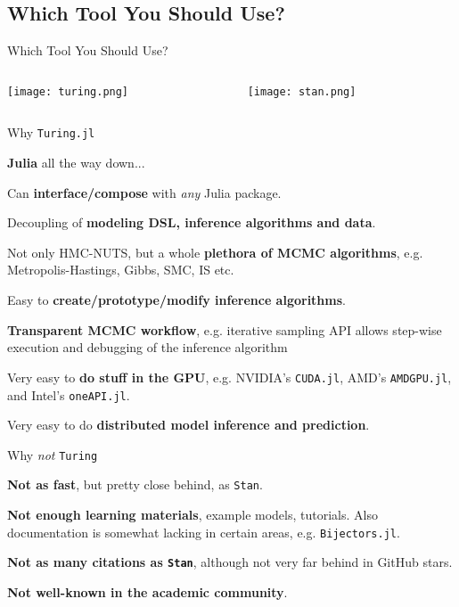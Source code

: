 \subsection{Which Tool You Should Use?}
\begin{frame}{Which Tool You Should Use?}
	\begin{columns}
		\begin{column}{0.5\textwidth}
			\centering
			\texttt{[image: turing.png]}
		\end{column}
		\begin{column}{0.5\textwidth}
			\centering
			\texttt{[image: stan.png]}
		\end{column}
	\end{columns}
\end{frame}

\begin{frame}{Why \texttt{Turing.jl}}
	\begin{vfilleditems}
		\item \textbf{Julia} all the way down...
		\item Can \textbf{interface/compose} with \textit{any} Julia package.
		\item Decoupling of \textbf{modeling DSL, inference algorithms and data}.
		\item Not only HMC-NUTS, but a whole \textbf{plethora of MCMC algorithms}, e.g. Metropolis-Hastings, Gibbs, SMC, IS etc.
		\item Easy to \textbf{create/prototype/modify inference algorithms}.
		\item \textbf{Transparent MCMC workflow}, e.g. iterative sampling API allows step-wise execution and debugging of the inference algorithm
		\item Very easy to \textbf{do stuff in the GPU}, e.g. NVIDIA's \texttt{CUDA.jl}, AMD's \texttt{AMDGPU.jl}, and Intel's \texttt{oneAPI.jl}.
		\item Very easy to do \textbf{distributed model inference and prediction}.
	\end{vfilleditems}
\end{frame}

\begin{frame}{Why \textit{not} \texttt{Turing}}
	\begin{vfilleditems}
		\item \textbf{Not as fast}, but pretty close behind, as \texttt{Stan}.
		\item \textbf{Not enough learning materials}, example models, tutorials.
		Also documentation is somewhat lacking in certain areas, e.g. \texttt{Bijectors.jl}.
		\item \textbf{Not as many citations as \texttt{Stan}},
		although not very far behind in GitHub stars.
		\item \textbf{Not well-known in the academic community}.
	\end{vfilleditems}
\end{frame}

